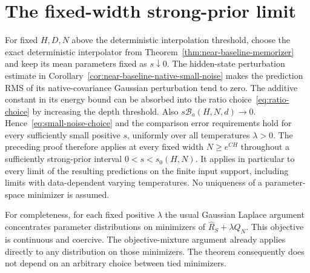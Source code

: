 \section{The fixed-width strong-prior limit}
For fixed $H,D,N$ above the deterministic interpolation threshold, choose the exact deterministic interpolator from Theorem~\ref{thm:near-baseline-memorizer} and keep its mean parameters fixed as $s\downarrow0$. The hidden-state perturbation estimate in Corollary~\ref{cor:near-baseline-native-small-noise} makes the prediction RMS of its native-covariance Gaussian perturbation tend to zero. The additive constant in its energy bound can be absorbed into the ratio choice~\eqref{eq:ratio-choice} by increasing the depth threshold. Also $s\mathcal B_a(H,N,d)\to0$. Hence~\eqref{eq:small-noise-choice} and the comparison error requirements hold for every sufficiently small positive $s$, uniformly over all temperatures $\lambda>0$.
The preceding proof therefore applies at every fixed width $N\ge e^{CH}$ throughout a sufficiently strong-prior interval $0<s<s_0(H,N)$. It applies in particular to every limit of the resulting predictions on the finite input support, including limits with data-dependent varying temperatures. No uniqueness of a parameter-space minimizer is assumed.

For completeness, for each fixed positive $\lambda$ the usual Gaussian Laplace argument concentrates parameter distributions on minimizers of $\widehat R_S+\lambda Q_N$. This objective is continuous and coercive. The objective-mixture argument already applies directly to any distribution on those minimizers. The theorem consequently does not depend on an arbitrary choice between tied minimizers.

